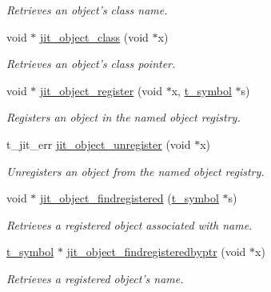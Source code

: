 \begin{DoxyCompactItemize}
\begin{DoxyCompactList}\small\item\em Retrieves an object's class name. \item\end{DoxyCompactList}\item 
void $\ast$ \hyperlink{group__objectmod_gaecadd79da84aa20fe845cc4916f25721}{jit\_\-object\_\-class} (void $\ast$x)
\begin{DoxyCompactList}\small\item\em Retrieves an object's class pointer. \item\end{DoxyCompactList}\item 
void $\ast$ \hyperlink{group__objectmod_gabcf088a00f36b6af8ce5896b81e4d0ef}{jit\_\-object\_\-register} (void $\ast$x, \hyperlink{structt__symbol}{t\_\-symbol} $\ast$s)
\begin{DoxyCompactList}\small\item\em Registers an object in the named object registry. \item\end{DoxyCompactList}\item 
t\_\-jit\_\-err \hyperlink{group__objectmod_ga21f77a08c1a98aaf68e4b2913487be0f}{jit\_\-object\_\-unregister} (void $\ast$x)
\begin{DoxyCompactList}\small\item\em Unregisters an object from the named object registry. \item\end{DoxyCompactList}\item 
void $\ast$ \hyperlink{group__objectmod_ga328c0beb469f32437b756852fe8583bf}{jit\_\-object\_\-findregistered} (\hyperlink{structt__symbol}{t\_\-symbol} $\ast$s)
\begin{DoxyCompactList}\small\item\em Retrieves a registered object associated with name. \item\end{DoxyCompactList}\item 
\hyperlink{structt__symbol}{t\_\-symbol} $\ast$ \hyperlink{group__objectmod_gaf59274b20cbf6a44cc4269a0a4165745}{jit\_\-object\_\-findregisteredbyptr} (void $\ast$x)
\begin{DoxyCompactList}\small\item\em Retrieves a registered object's name. \item\end{DoxyCompactList}\item 

\end{DoxyCompactItemize}
